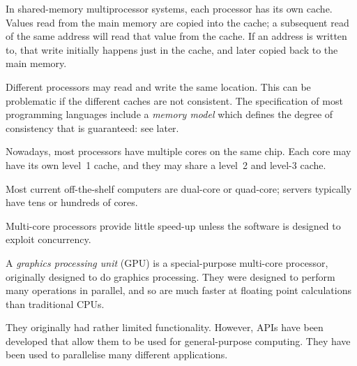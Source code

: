 In shared-memory multiprocessor systems, each processor has its own cache.
Values read from the main memory are copied into the cache; a subsequent read
of the same address will read that value from the cache.  If an address is
written to, that write initially happens just in the cache, and later copied
back to the main memory.

Different processors may read and write the same location.  This can be
problematic if the different caches are not consistent.  The specification of
most programming languages include a \emph{memory model} which defines the
degree of consistency that is guaranteed: see later.





Nowadays, most processors have multiple cores on the same chip.  Each core may
have its own level~1 cache, and they may share a level~2  and level-3 cache.


%

Most current off-the-shelf computers are dual-core or quad-core; servers
typically have tens or hundreds of cores.

Multi-core processors provide little speed-up unless the software is designed
to exploit concurrency.



A \emph{graphics processing unit} (GPU) is a special-purpose multi-core
processor, originally designed to do graphics processing.  They were designed
to perform many operations in parallel, and so are much faster at floating
point calculations than traditional
CPUs.

They originally had rather limited functionality.  However, APIs have
been developed that allow them to be used for general-purpose computing.  They
have been used to parallelise many different
applications.

